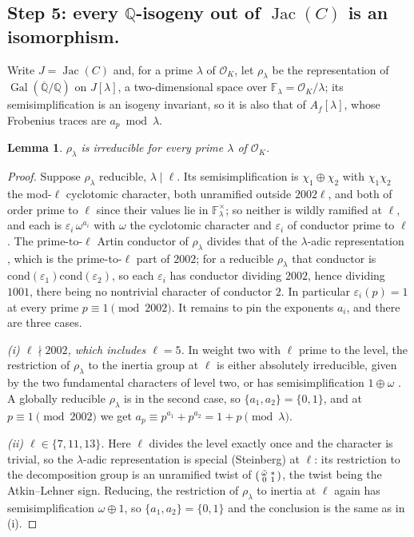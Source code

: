 \documentclass[11pt,reqno]{amsart}
\theoremstyle{plain}
\newtheorem{lemma}[theorem]{Lemma}
\theoremstyle{definition}
\DeclareMathOperator{\Jac}{Jac}
\DeclareMathOperator{\Gal}{Gal}
\newcommand{\Q}{\mathbb{Q}}
\newcommand{\F}{\mathbb{F}}
\newcommand{\Qbar}{\overline{\mathbb{Q}}}
\newcommand{\OK}{\mathcal{O}_K}
\begin{document}
\subsection*{Step 5: every $\Q$-isogeny out of $\Jac(C)$ is an isomorphism.}
Write $J=\Jac(C)$ and, for a prime $\lambda$ of $\OK$, let $\rho_\lambda$ be the representation of
$\Gal(\Qbar/\Q)$ on $J[\lambda]$, a two-dimensional space over $\F_\lambda=\OK/\lambda$; its
semisimplification is an isogeny invariant, so it is also that of $A_f[\lambda]$, whose Frobenius
traces are $a_p \bmod \lambda$.

\begin{lemma}\label{lem:irred}
$\rho_\lambda$ is irreducible for every prime $\lambda$ of $\OK$.
\end{lemma}
\begin{proof}
Suppose $\rho_\lambda$ reducible, $\lambda\mid\ell$. Its semisimplification is $\chi_1\oplus\chi_2$
with $\chi_1\chi_2$ the mod-$\ell$ cyclotomic character, both unramified outside $2002\ell$, and
both of order prime to $\ell$ since their values lie in $\F_\lambda^\times$; so neither is wildly
ramified at $\ell$, and each is $\varepsilon_i\,\omega^{a_i}$ with $\omega$ the cyclotomic
character and $\varepsilon_i$ of conductor prime to $\ell$. The prime-to-$\ell$ Artin
conductor of $\rho_\lambda$ divides that of the $\lambda$-adic representation \cite{carayol89},
which is the prime-to-$\ell$ part of $2002$; for a reducible $\rho_\lambda$ that conductor is
$\mathrm{cond}(\varepsilon_1)\mathrm{cond}(\varepsilon_2)$, so each $\varepsilon_i$ has conductor
dividing $2002$, hence dividing $1001$, there being no nontrivial character of conductor $2$. In
particular $\varepsilon_i(p)=1$ at every prime $p\equiv1\pmod{2002}$. It remains to pin the
exponents $a_i$, and there are three cases.

\emph{(i) $\ell\nmid2002$, which includes $\ell=5$.} In weight two with $\ell$ prime to the level,
the restriction of $\rho_\lambda$ to the inertia group at $\ell$ is either absolutely irreducible,
given by the two fundamental characters of level two, or has semisimplification $1\oplus\omega$
\cite{edixhoven}. A globally reducible $\rho_\lambda$ is in the second case, so
$\{a_1,a_2\}=\{0,1\}$, and at $p\equiv1\pmod{2002}$ we get $a_p\equiv p^{a_1}+p^{a_2}=1+p
\pmod\lambda$.

\emph{(ii) $\ell\in\{7,11,13\}$.} Here $\ell$ divides the level exactly once and the character is
trivial, so the $\lambda$-adic representation is special (Steinberg) at $\ell$: its restriction to
the decomposition group is an unramified twist of $\begin{psmallmatrix}\tilde\omega&*\\0&1
\end{psmallmatrix}$, the twist being the Atkin--Lehner sign. Reducing, the restriction of
$\rho_\lambda$ to inertia at $\ell$ again has semisimplification $\omega\oplus1$, so
$\{a_1,a_2\}=\{0,1\}$ and the conclusion is the same as in (i).


\end{proof}
\end{document}
